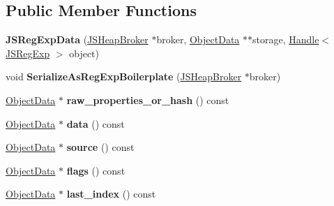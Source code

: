 \subsection*{Public Member Functions}
\begin{DoxyCompactItemize}
\item 
\mbox{\label{classv8_1_1internal_1_1compiler_1_1JSRegExpData_a5a93353a47206575f16d6147dbd1874d}} 
{\bfseries J\+S\+Reg\+Exp\+Data} (\mbox{\hyperlink{classv8_1_1internal_1_1compiler_1_1JSHeapBroker}{J\+S\+Heap\+Broker}} $\ast$broker, \mbox{\hyperlink{classv8_1_1internal_1_1compiler_1_1ObjectData}{Object\+Data}} $\ast$$\ast$storage, \mbox{\hyperlink{classv8_1_1internal_1_1Handle}{Handle}}$<$ \mbox{\hyperlink{classv8_1_1internal_1_1JSRegExp}{J\+S\+Reg\+Exp}} $>$ object)
\item 
\mbox{\label{classv8_1_1internal_1_1compiler_1_1JSRegExpData_a7a4d9263ff3ded1be574cc4f9662345d}} 
void {\bfseries Serialize\+As\+Reg\+Exp\+Boilerplate} (\mbox{\hyperlink{classv8_1_1internal_1_1compiler_1_1JSHeapBroker}{J\+S\+Heap\+Broker}} $\ast$broker)
\item 
\mbox{\label{classv8_1_1internal_1_1compiler_1_1JSRegExpData_a65dbd1cff65ec59bba08d63d57af76cb}} 
\mbox{\hyperlink{classv8_1_1internal_1_1compiler_1_1ObjectData}{Object\+Data}} $\ast$ {\bfseries raw\+\_\+properties\+\_\+or\+\_\+hash} () const
\item 
\mbox{\label{classv8_1_1internal_1_1compiler_1_1JSRegExpData_a47928931a042a847b34d761132faae2d}} 
\mbox{\hyperlink{classv8_1_1internal_1_1compiler_1_1ObjectData}{Object\+Data}} $\ast$ {\bfseries data} () const
\item 
\mbox{\label{classv8_1_1internal_1_1compiler_1_1JSRegExpData_abcea83af59d8d120c2df13de5d814573}} 
\mbox{\hyperlink{classv8_1_1internal_1_1compiler_1_1ObjectData}{Object\+Data}} $\ast$ {\bfseries source} () const
\item 
\mbox{\label{classv8_1_1internal_1_1compiler_1_1JSRegExpData_a3650daa90fcfd64b5965c1084b75a963}} 
\mbox{\hyperlink{classv8_1_1internal_1_1compiler_1_1ObjectData}{Object\+Data}} $\ast$ {\bfseries flags} () const
\item 
\mbox{\label{classv8_1_1internal_1_1compiler_1_1JSRegExpData_a01933ae4c6bd34d4d9f47a7f5fffa030}} 
\mbox{\hyperlink{classv8_1_1internal_1_1compiler_1_1ObjectData}{Object\+Data}} $\ast$ {\bfseries last\+\_\+index} () const
\end{DoxyCompactItemize}
